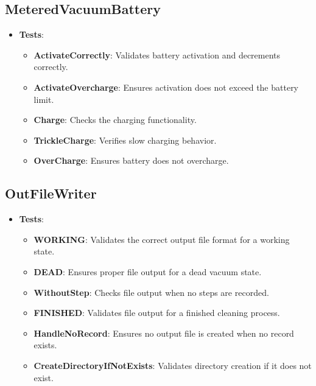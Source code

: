 \documentclass{article}
\begin{document}
\subsection{MeteredVacuumBattery}
\begin{itemize}
    \item \textbf{Tests}:
    \begin{itemize}
        \item \textbf{ActivateCorrectly}: Validates battery activation and decrements correctly.
        \item \textbf{ActivateOvercharge}: Ensures activation does not exceed the battery limit.
        \item \textbf{Charge}: Checks the charging functionality.
        \item \textbf{TrickleCharge}: Verifies slow charging behavior.
        \item \textbf{OverCharge}: Ensures battery does not overcharge.
    \end{itemize}
\end{itemize}

\subsection{OutFileWriter}
\begin{itemize}
    \item \textbf{Tests}:
    \begin{itemize}
        \item \textbf{WORKING}: Validates the correct output file format for a working state.
        \item \textbf{DEAD}: Ensures proper file output for a dead vacuum state.
        \item \textbf{WithoutStep}: Checks file output when no steps are recorded.
        \item \textbf{FINISHED}: Validates file output for a finished cleaning process.
        \item \textbf{HandleNoRecord}: Ensures no output file is created when no record exists.
        \item \textbf{CreateDirectoryIfNotExists}: Validates directory creation if it does not exist.
    \end{itemize}
\end{itemize}
\end{document}
